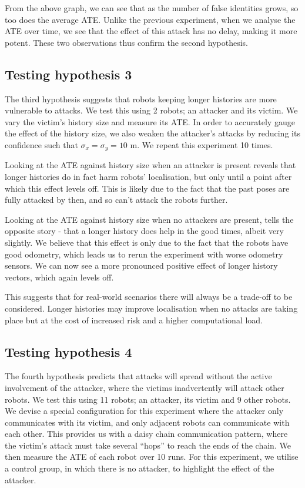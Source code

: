 From the above graph, we can see that as the number of false identities grows, so too does the average ATE. Unlike the previous experiment, when we analyse the ATE over time, we see that the effect of this attack has no delay, making it more potent. These two observations thus confirm the second hypothesis.

\subsection{Testing hypothesis 3}
The third hypothesis suggests that robots keeping longer histories are more vulnerable to attacks. We test this using 2 robots; an attacker and its victim. We vary the victim's history size and measure its ATE. In order to accurately gauge the effect of the history size, we also weaken the attacker's attacks by reducing its confidence such that $\sigma_x = \sigma_y = 10$ m. We repeat this experiment 10 times.


Looking at the ATE against history size when an attacker is present reveals that longer histories do in fact harm robots' localisation, but only until a point after which this effect levels off. This is likely due to the fact that the past poses are fully attacked by then, and so can't attack the robots further.

Looking at the ATE against history size when no attackers are present, tells the opposite story - that a longer history does help in the good times, albeit very slightly. We believe that this effect is only due to the fact that the robots have good odometry, which leads us to rerun the experiment with worse odometry sensors. We can now see a more pronounced positive effect of longer history vectors, which again levels off.

This suggests that for real-world scenarios there will always be a trade-off to be considered. Longer histories may improve localisation when no attacks are taking place but at the cost of increased risk and a higher computational load.

\subsection{Testing hypothesis 4}
The fourth hypothesis predicts that attacks will spread without the active involvement of the attacker, where the victims inadvertently will attack other robots. We test this using 11 robots; an attacker, its victim and 9 other robots. We devise a special configuration for this experiment where the attacker only communicates with its victim, and only adjacent robots can communicate with each other. This provides us with a daisy chain communication pattern, where the victim's attack must take several ``hops'' to reach the ends of the chain. We then measure the ATE of each robot over 10 runs. For this experiment, we utilise a control group, in which there is no attacker, to highlight the effect of the attacker.


